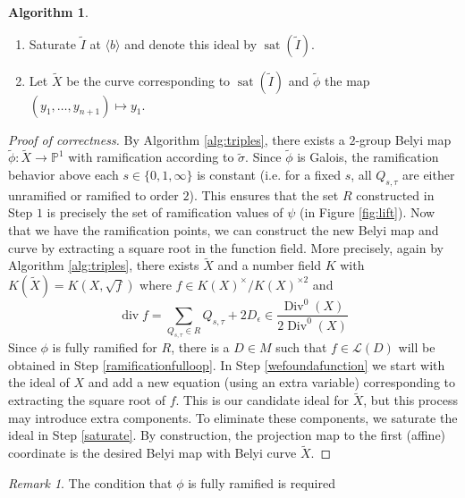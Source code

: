 \documentclass{dcthesis}
\newcommand{\PP}{\mathbb P}
\newcommand{\wt}[1]{\widetilde{#1}}
\newcommand{\LL}{\mathscr L}
\DeclareMathOperator{\Div}{Div}
\DeclareMathOperator{\ddiv}{div}
\DeclareMathOperator{\sat}{sat}
\numberwithin{equation}{section}
\theoremstyle{definition}
\newtheorem{alg}[equation]{Algorithm}
\theoremstyle{remark}
\newtheorem{remark}[equation]{Remark}
\begin{document}
{{\begin{alg}
\begin{enumerate}
        \item
          \label{saturate}
          Saturate $\wt{I}$ at $\langle b\rangle$ and denote this ideal by $\sat(\wt{I})$.
        \item
          Let $\wt{X}$ be the curve corresponding to $\sat(\wt{I})$ and
          $\wt{\phi}$ the map $(y_1,\dots,y_{n+1})\mapsto y_1$.
      \end{enumerate}
    \end{alg}
    \begin{proof}[Proof of correctness]
      By Algorithm \ref{alg:triples},
      there exists a $2$-group Belyi map $\wt{\phi}:\wt{X}\to\PP^1$
      with ramification according to $\wt{\sigma}$.
      Since $\wt{\phi}$ is Galois,
      the ramification behavior above each $s\in\{0,1,\infty\}$
      is constant
      (i.e. for a fixed $s$, all $Q_{s,\tau}$ are either unramified or
      ramified to order $2$).
      This ensures that the set $R$ constructed in Step $1$
      is precisely the set of ramification values of $\psi$
      (in Figure \ref{fig:lift}).
      Now that we have the ramification points,
      we can construct the new Belyi map and curve
      by extracting a square root in the function field.
      More precisely,
      again by Algorithm \ref{alg:triples},
      there exists $\wt{X}$ and a number field $K$
      with $K(\wt{X}) = K(X,\sqrt{f})$
      where $f\in K(X)^\times/K(X)^{\times 2}$
      and
      \begin{equation}\label{eqn:classgroup}
        \ddiv f= \sum_{Q_{s,\tau}\in R} Q_{s,\tau}+2D_\epsilon
        \in\frac{\Div^0(X)}{2\Div^0(X)}
      \end{equation}
      Since $\phi$ is fully ramified for $R$,
      there is a $D\in M$ such that
      $f\in\LL(D)$
      will be obtained in Step \ref{ramificationfulloop}.
      In Step \ref{wefoundafunction}
      we start with the ideal of $X$
      and add a new equation (using an extra variable)
      corresponding to extracting the square root of $f$.
      This is our candidate ideal for $\wt{X}$,
      but this process may introduce extra components.
      To eliminate these components, we saturate the ideal
      in Step \ref{saturate}.
      By construction,
      the projection map to the first (affine)
      coordinate
      is the desired Belyi map
      with Belyi curve $\wt{X}$.
    \end{proof}
    \begin{remark}
      \label{rmk:fullyramifiedinpractice}
      The condition that $\phi$
      is fully ramified is required

\end{remark}}}
\end{document}

